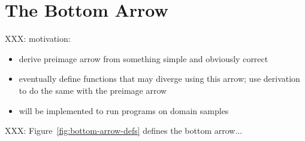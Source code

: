 \documentclass[preprint]{sigplanconf}
\newcommand{\pto}{\rightharpoonup}
\begin{document}
\begin{comment}
XXX: Probabilities of output sets are preimage measures: if $f \in A \pto B$ is $\A-\B$-measurable and $\P \in \A \to [0,1]$, then
\begin{equation}
	\P~(preimage~f~B)
\end{equation}
is the probability of $B$.

XXX: more explanation, and an example
\end{comment}


\section{The Bottom Arrow}

XXX: motivation:
\begin{itemize}
	\item derive preimage arrow from something simple and obviously correct
	\item eventually define functions that may diverge using this arrow; use derivation to do the same with the preimage arrow
	\item will be implemented to run programs on domain samples
\end{itemize}

XXX: Figure~\ref{fig:bottom-arrow-defs} defines the bottom arrow...
\end{document}
